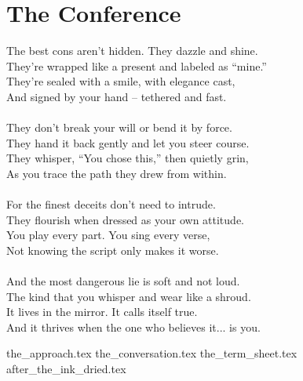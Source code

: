 \part{The Conference}

\vfill

\begin{flushright}
    \Large
    The best cons aren’t hidden. They dazzle and shine. \\
    They're wrapped like a present and labeled as ``mine.'' \\
    They’re sealed with a smile, with elegance cast, \\
    And signed by your hand -- tethered and fast. \\
    \ \\
    They don’t break your will or bend it by force. \\
    They hand it back gently and let you steer course. \\
    They whisper, ``You chose this,'' then quietly grin, \\
    As you trace the path they drew from within. \\
    \ \\
    For the finest deceits don’t need to intrude.\\
    They flourish when dressed as your own attitude. \\
    You play every part. You sing every verse, \\
    Not knowing the script only makes it worse. \\
    \ \\
    And the most dangerous lie is soft and not loud.\\
    The kind that you whisper and wear like a shroud. \\
    It lives in the mirror. It calls itself true. \\
    And it thrives when the one who believes it... is you. \\
\end{flushright}


{the_approach.tex}
{the_conversation.tex}
{the_term_sheet.tex}
{after_the_ink_dried.tex}